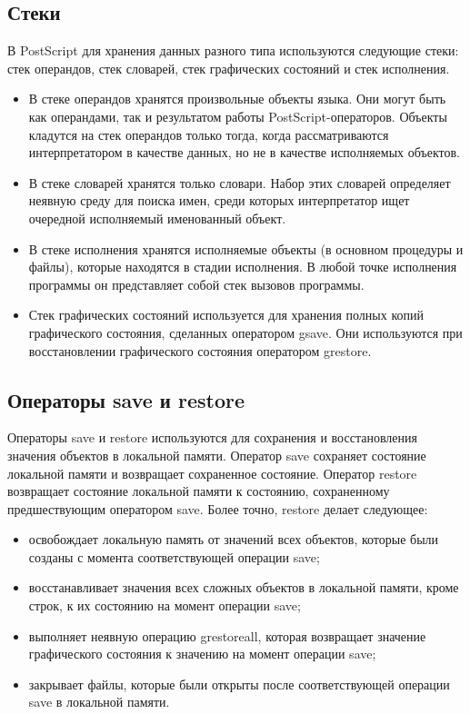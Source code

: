 \subsection{Стеки}

В PostScript для хранения данных разного типа используются следующие стеки: стек операндов, стек словарей, стек графических состояний и стек исполнения. 
\begin{itemize}
\item В стеке операндов хранятся произвольные объекты языка. Они могут быть как операндами, так и результатом работы PostScript-операторов. Объекты кладутся на стек операндов только тогда, когда рассматриваются интерпретатором в качестве данных, но не в качестве исполняемых объектов.
\item 	В стеке словарей хранятся только словари. Набор этих словарей определяет неявную среду для поиска имен, среди которых интерпретатор ищет очередной исполняемый именованный объект.
\item 	В стеке исполнения хранятся исполняемые объекты (в основном процедуры и файлы), которые находятся в стадии исполнения. В любой точке исполнения программы он представляет собой стек вызовов программы.
\item 	Стек графических состояний используется для хранения полных копий графического состояния, сделанных оператором gsave. Они используются при восстановлении графического состояния оператором grestore.
\end{itemize}


\subsection{Операторы save и restore}
Операторы save и restore используются для сохранения и восстановления значения объектов в локальной памяти. Оператор save сохраняет состояние локальной памяти и возвращает сохраненное состояние. Оператор restore возвращает состояние локальной памяти к состоянию, сохраненному предшествующим оператором save. Более точно, restore делает следующее:
\begin{itemize}
\item освобождает локальную память от значений всех объектов, которые были созданы с момента соответствующей операции save;
\item восстанавливает значения всех сложных объектов в локальной памяти, кроме строк, к их состоянию на момент операции save;
\item выполняет неявную операцию grestoreall, которая возвращает значение графического состояния к значению на момент операции save;
\item закрывает файлы, которые были открыты после соответствующей операции save в локальной памяти.
\end{itemize}

